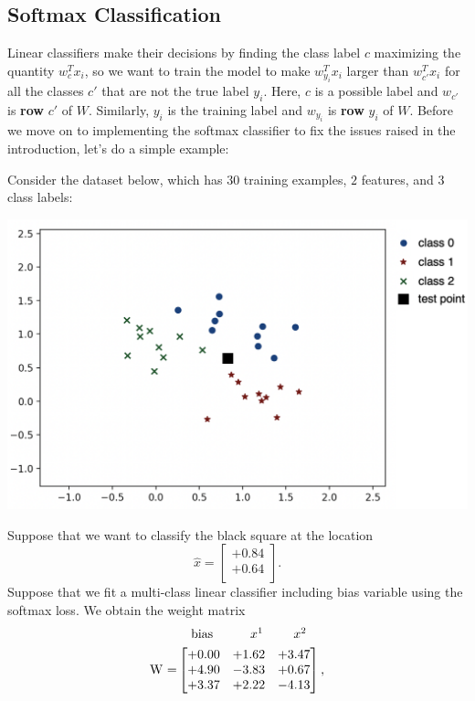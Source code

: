 \documentclass{article}
\begin{document}
\subsection{Softmax Classification}

Linear classifiers make their decisions by finding the class label $c$ maximizing the quantity $w_c^Tx_i$, so we want to train the model to make $w_{y_i}^Tx_i$ larger than $w_{c'}^Tx_i$ for all the classes $c'$ that are not the true label $y_i$.
Here, $c$ is a possible label and $w_{c'}$ is \textbf{row} $c'$ of $W$. Similarly, $y_i$ is the training label and $w_{y_i}$ is \textbf{row} $y_i$ of $W$. Before we move on to implementing the softmax classifier to fix the issues raised in the introduction, let's do a simple example:

Consider the dataset below, which has $30$ training examples, $2$ features, and $3$ class labels:\\
\begin{center}\includegraphics[scale=0.3]{figs/softmaxData.png}\end{center}
Suppose that we want to classify the black square at the location
\[
\hat{x} = \begin{bmatrix}+0.84 \\ +0.64\\ \end{bmatrix}.
\]
Suppose that we fit a multi-class linear classifier including bias variable using the softmax loss. We obtain the weight matrix
\[
\raisebox{-0.28cm}{W =}
\begin{aligned}
            &
            \begin{matrix*}[c]
            \mkern20mu\textrm{bias} & \mkern35mu x^{1} & \mkern25mu x^{2}
            \end{matrix*}
            \\
            &
            \begin{bmatrix*}[r]
                +0.00 & +1.62 & +3.47\\
                +4.90 & -3.83 & +0.67\\
                +3.37 & +2.22 & -4.13 
            \end{bmatrix*},
\end{aligned}
\]
\end{document}
